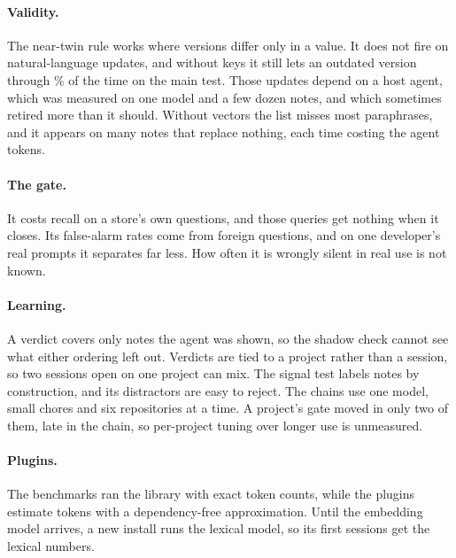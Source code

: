 \paragraph{Validity.} The near-twin rule works where versions differ only in a value. It does not fire on natural-language updates, and without keys it still lets an outdated version through \% of the time on the main test. Those updates depend on a host agent, which was measured on one model and a few dozen notes, and which sometimes retired more than it should. Without vectors the list misses most paraphrases, and it appears on many notes that replace nothing, each time costing the agent tokens.

\paragraph{The gate.} It costs recall on a store's own questions, and those queries get nothing when it closes. Its false-alarm rates come from foreign questions, and on one developer's real prompts it separates far less. How often it is wrongly silent in real use is not known.

\paragraph{Learning.} A verdict covers only notes the agent was shown, so the shadow check cannot see what either ordering left out. Verdicts are tied to a project rather than a session, so two sessions open on one project can mix. The signal test labels notes by construction, and its distractors are easy to reject. The chains use one model, small chores and six repositories at a time. A project's gate moved in only two of them, late in the chain, so per-project tuning over longer use is unmeasured.

\paragraph{Plugins.} The benchmarks ran the library with exact token counts, while the plugins estimate tokens with a dependency-free approximation. Until the embedding model arrives, a new install runs the lexical model, so its first sessions get the lexical numbers.
